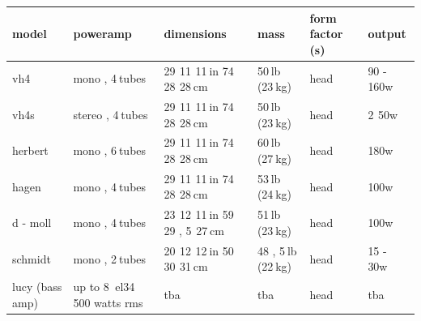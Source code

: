 \documentclass{article}
\begin{document}
\begin{tabular}{llllll}
\toprule
model & poweramp & dimensions & mass & form factor (s) & output \\
\midrule
vh4 & mono , 4 tubes  & 29  11  11 in 74  28  28 cm & 50 lb (23 kg) & head & 90 - 160w \\
vh4s & stereo , 4 tubes & 29  11  11 in 74  28  28 cm & 50 lb (23 kg) & head & 2  50w \\
herbert & mono , 6 tubes & 29  11  11 in 74  28  28 cm & 60 lb (27 kg) & head & 180w \\
hagen & mono , 4 tubes & 29  11  11 in 74  28  28 cm & 53 lb (24 kg) & head & 100w \\
d - moll & mono , 4 tubes & 23  12  11 in 59  29 , 5  27 cm & 51 lb (23 kg) & head & 100w \\
schmidt & mono , 2 tubes & 20  12  12 in 50  30  31 cm & 48 , 5 lb (22 kg) & head & 15 - 30w \\
lucy (bass amp) & up to 8  el34 500 watts rms & tba & tba & head & tba \\
\bottomrule
\end{tabular}
\end{document}
